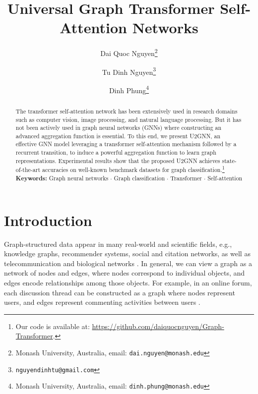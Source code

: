 \documentclass[twoside,leqno,twocolumn]{article}
\newcommand{\citep}{\cite}
\begin{document}
\title{Universal Graph Transformer Self-Attention Networks}

\author{Dai Quoc Nguyen\thanks{Monash University, Australia, email: {\tt dai.nguyen@monash.edu}} \and Tu Dinh Nguyen\thanks{{\tt nguyendinhtu@gmail.com}} \and Dinh Phung\thanks{Monash University, Australia, email: {\tt dinh.phung@monash.edu}}
}

\date{}

\maketitle

\begin{abstract}
The transformer self-attention network has been extensively used in research domains such as computer vision, image processing, and natural language processing. But it has not been actively used in graph neural networks (GNNs) where constructing an advanced aggregation function is essential. To this end, we present U2GNN, an effective GNN model leveraging a transformer self-attention mechanism followed by a recurrent transition, to induce a powerful aggregation function to learn graph representations. Experimental results show that the proposed U2GNN achieves state-of-the-art accuracies on well-known benchmark datasets for graph classification.\footnote{Our code is available at: \url{https://github.com/daiquocnguyen/Graph-Transformer}.}
\\

\noindent \textbf{Keywords:} Graph neural networks $\cdot$ Graph classification $\cdot$  Transformer $\cdot$ Self-attention


\end{abstract}

\section{Introduction}

Graph-structured data appear in many real-world and scientific fields, e.g., knowledge graphs, recommender systems,  social and citation networks, as well as telecommunication and biological networks \citep{battaglia2018relational,zhang2018deep}. 
In general, we can view a graph as a network of nodes and edges, where nodes correspond to individual objects, and edges encode relationships among those objects. 
For example, in an online forum, each discussion thread can be constructed as a graph where nodes represent users, and edges represent commenting activities between users \citep{yanardag2015deep}.
\end{document}
